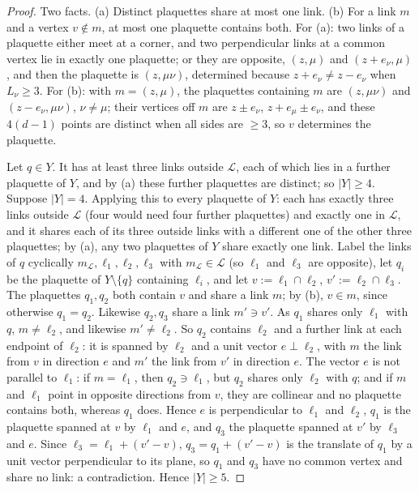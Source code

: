 \documentclass[11pt,a4paper]{article}
\theoremstyle{definition}
\theoremstyle{remark}
\begin{document}
\begin{proof}
Two facts. (a) Distinct plaquettes share at most one link. (b) For a link $m$ and a vertex $v\notin m$, at most one plaquette contains both.
For (a): two links of a plaquette either meet at a corner, and two perpendicular links at a common vertex lie in exactly one plaquette; or
they are opposite, $(z,\mu)$ and $(z+e_\nu,\mu)$, and then the plaquette is $(z,\mu\nu)$, determined because $z+e_\nu\neq z-e_\nu$ when
$L_\nu\ge3$. For (b): with $m=(z,\mu)$, the plaquettes containing $m$ are $(z,\mu\nu)$ and $(z-e_\nu,\mu\nu)$, $\nu\neq\mu$; their vertices off
$m$ are $z\pm e_\nu$, $z+e_\mu\pm e_\nu$, and these $4(d-1)$ points are distinct when all sides are $\ge3$, so $v$ determines the plaquette.

Let $q\in Y$. It has at least three links outside $\mathcal L$, each of which lies in a further plaquette of $Y$, and by (a) these further plaquettes
are distinct; so $|Y|\ge4$. Suppose $|Y|=4$. Applying this to every plaquette of $Y$: each has exactly three links outside $\mathcal L$ (four would
need four further plaquettes) and exactly one in $\mathcal L$, and it shares each of its three outside links with a different one of the other three
plaquettes; by (a), any two plaquettes of $Y$ share exactly one link. Label the links of $q$ cyclically $m_{\mathcal L},\ell_1,\ell_2,\ell_3$ with
$m_{\mathcal L}\in\mathcal L$ (so $\ell_1$ and $\ell_3$ are opposite), let $q_i$ be the plaquette of $Y\setminus\{q\}$ containing $\ell_i$, and let
$v:=\ell_1\cap\ell_2$, $v':=\ell_2\cap\ell_3$. The plaquettes $q_1,q_2$ both contain $v$ and share a link $m$; by (b), $v\in m$, since otherwise
$q_1=q_2$. Likewise $q_2,q_3$ share a link $m'\ni v'$. As $q_1$ shares only $\ell_1$ with $q$, $m\neq\ell_2$, and likewise $m'\neq\ell_2$. So $q_2$
contains $\ell_2$ and a further link at each endpoint of $\ell_2$: it is spanned by $\ell_2$ and a unit vector $e\perp\ell_2$, with $m$ the link
from $v$ in direction $e$ and $m'$ the link from $v'$ in direction $e$. The vector $e$ is not parallel to $\ell_1$: if $m=\ell_1$, then
$q_2\ni\ell_1$, but $q_2$ shares only $\ell_2$ with $q$; and if $m$ and $\ell_1$ point in opposite directions from $v$, they are collinear and no
plaquette contains both, whereas $q_1$ does. Hence $e$ is perpendicular to $\ell_1$ and $\ell_2$, $q_1$ is the plaquette spanned at $v$ by $\ell_1$
and $e$, and $q_3$ the plaquette spanned at $v'$ by $\ell_3$ and $e$. Since $\ell_3=\ell_1+(v'-v)$, $q_3=q_1+(v'-v)$ is the translate of $q_1$ by a
unit vector perpendicular to its plane, so $q_1$ and $q_3$ have no common vertex and share no link: a contradiction. Hence $|Y|\ge5$.
\end{proof}
\end{document}
